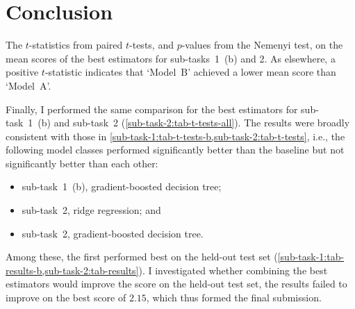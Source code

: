 \section{Conclusion}
\label{sec:conclusion}

\begin{table}
	\centering
	
	\caption{
		The $t$-statistics from paired $t$-tests, and $p$-values from the Nemenyi test, on
		the mean scores of the best estimators for sub-tasks~1~(b) and 2.
		As elsewhere, a positive $t$-statistic indicates that `Model~B' achieved a lower mean
		score than `Model~A'.
	}
	\label{sub-task-2:tab-t-tests-all}
\end{table}

Finally, I performed the same comparison for the best estimators for sub-task~1~(b) and
sub-task~2 (\cref{sub-task-2:tab-t-tests-all}).
The results were broadly consistent with those in
\cref{sub-task-1:tab-t-tests-b,sub-task-2:tab-t-tests}, i.e., the following model classes
performed significantly better than the baseline but not significantly better than
each other:
\begin{itemize}
	\item sub-task~1~(b), gradient-boosted decision tree;
	\item sub-task~2, ridge regression; and
	\item sub-task~2, gradient-boosted decision tree.
\end{itemize}
Among these, the first performed best on the held-out test set
(\cref{sub-task-1:tab-results-b,sub-task-2:tab-results}).
I investigated whether combining the best estimators would improve the score on the
held-out test set, the results failed to improve on the best score of $2.15$, which
thus formed the final submission.
